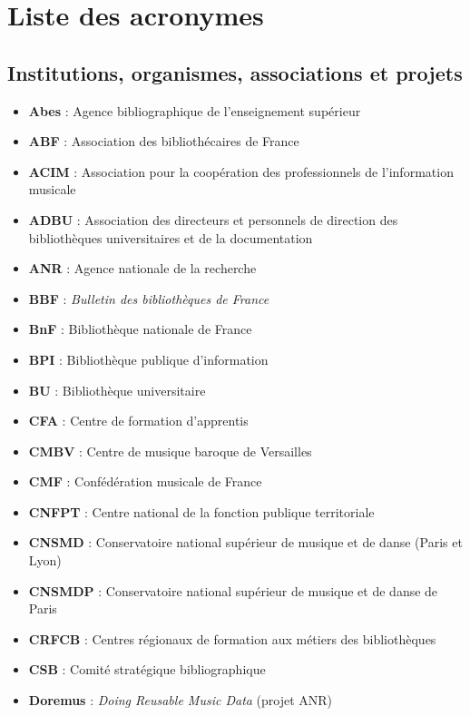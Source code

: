 \chapter*{Liste des acronymes}

\section*{Institutions, organismes, associations et projets}

\begin{itemize}
	\item \textbf{Abes} : Agence bibliographique de l'enseignement supérieur
	\item \textbf{ABF} : Association des bibliothécaires de France
	\item \textbf{ACIM} : Association pour la coopération des professionnels de l'information musicale
	\item \textbf{ADBU} : Association des directeurs et personnels de direction des bibliothèques universitaires et de la documentation
	\item \textbf{ANR} : Agence nationale de la recherche
	\item \textbf{BBF} : \textit{Bulletin des bibliothèques de France}
	\item \textbf{BnF} : Bibliothèque nationale de France
	\item \textbf{BPI} : Bibliothèque publique d'information
	\item \textbf{BU} : Bibliothèque universitaire
	\item \textbf{CFA} : Centre de formation d'apprentis
	\item \textbf{CMBV} : Centre de musique baroque de Versailles
	\item \textbf{CMF} : Confédération musicale de France
	\item \textbf{CNFPT} : Centre national de la fonction publique territoriale
	\item \textbf{CNSMD} : Conservatoire national supérieur de musique et de danse (Paris et Lyon)
	\item \textbf{CNSMDP} : Conservatoire national supérieur de musique et de danse de Paris
	\item \textbf{CRFCB} : Centres régionaux de formation aux métiers des bibliothèques
	\item \textbf{CSB} : Comité stratégique bibliographique
	\item \textbf{Doremus} : \textit{Doing Reusable Music Data} (projet ANR)

\end{itemize}
